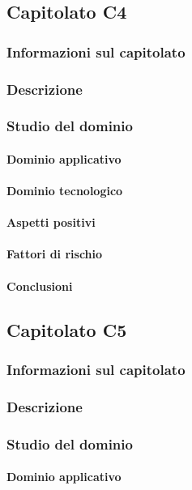 	\subsection{Capitolato C4}
	\subsubsection{Informazioni sul capitolato}
	\subsubsection{Descrizione}
	\subsubsection{Studio del dominio}
	\paragraph{Dominio applicativo}
	\paragraph{Dominio tecnologico}
	\paragraph{Aspetti positivi}
	\paragraph{Fattori di rischio}
	\paragraph{Conclusioni}
	
		\subsection{Capitolato C5}
	\subsubsection{Informazioni sul capitolato}
	\subsubsection{Descrizione}
	\subsubsection{Studio del dominio}
	\paragraph{Dominio applicativo}

